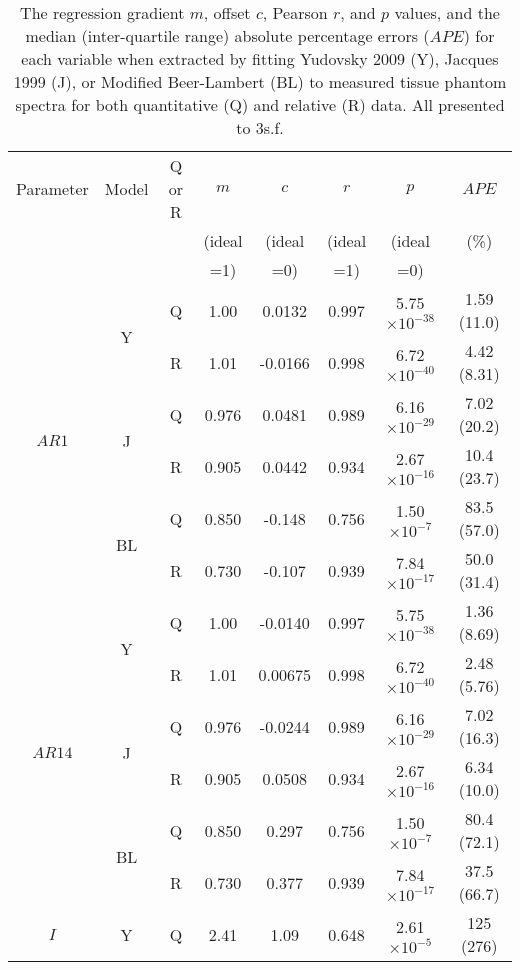 \begin{subappendices}
\begin{table}[htb!]
    \centering
    \caption{The regression gradient $m$, offset $c$, Pearson $r$, and $p$ values, and the median (inter-quartile range) absolute percentage errors ($APE$) for each variable when extracted by fitting Yudovsky 2009 (Y), Jacques 1999 (J), or Modified Beer-Lambert (BL) to measured tissue phantom spectra for both quantitative (Q) and relative (R) data. All presented to 3s.f.}
    \begin{tabular}{|ccc|ccccc|}
        \hline
        Parameter & Model & Q or R  & $m$ & $c$ & $r$ & $p$ & $APE$ \\
        & & & (ideal & (ideal & (ideal & (ideal & (\%)\\
        & & & =1) & =0) & =1) & =0) & \\
        \hline
        \multirow{6}{*}{$AR1$} & \multirow{2}{*}{Y} & Q & 1.00 & 0.0132 & 0.997 & 5.75$\times 10^{-38}$ & 1.59 (11.0) \\
        & & R & 1.01 & -0.0166 & 0.998 & 6.72$\times 10^{-40}$ & 4.42 (8.31) \\
        \cline{2-8}
        & \multirow{2}{*}{J} & Q & 0.976 & 0.0481 & 0.989 & 6.16$\times 10^{-29}$ & 7.02 (20.2) \\
        & & R & 0.905 & 0.0442 & 0.934 & 2.67$\times 10^{-16}$ & 10.4 (23.7) \\
        \cline{2-8}
        & \multirow{2}{*}{BL} & Q & 0.850 & -0.148 & 0.756 & 1.50$\times 10^{-7}$ & 83.5 (57.0) \\
        & & R & 0.730 & -0.107 & 0.939 & 7.84$\times 10^{-17}$ & 50.0 (31.4)\\
        \hline
        \multirow{6}{*}{$AR14$} & \multirow{2}{*}{Y} & Q & 1.00 & -0.0140 & 0.997 & 5.75$\times 10^{-38}$ & 1.36 (8.69) \\
        & & R & 1.01 & 0.00675 & 0.998 & 6.72$\times 10^{-40}$ & 2.48 (5.76) \\
        \cline{2-8}
        & \multirow{2}{*}{J} & Q & 0.976 & -0.0244 & 0.989 & 6.16$\times 10^{-29}$ & 7.02 (16.3) \\
        & & R & 0.905 & 0.0508 & 0.934 & 2.67$\times 10^{-16}$ & 6.34 (10.0) \\
        \cline{2-8}
        & \multirow{2}{*}{BL} & Q & 0.850 & 0.297 & 0.756 & 1.50$\times 10^{-7}$ & 80.4 (72.1) \\
        & & R & 0.730 & 0.377 & 0.939 & 7.84$\times 10^{-17}$ & 37.5 (66.7) \\
        \hline
        \multirow{6}{*}{$I$} & \multirow{2}{*}{Y} & Q & 2.41 & 1.09 & 0.648 & 2.61$\times 10^{-5}$ & 125 (276) \\

\end{tabular}
\end{table}
\end{subappendices}
